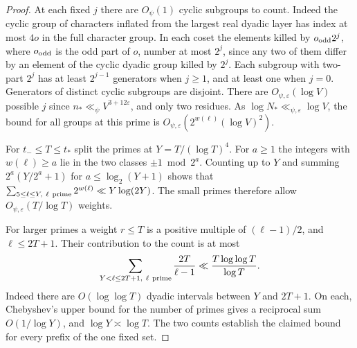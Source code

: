 \documentclass[a4paper,11pt]{article}
\theoremstyle{definition}
\theoremstyle{remark}
\numberwithin{equation}{section}
\begin{document}
\begin{proof}
At each fixed \(j\) there are \(O_\psi(1)\) cyclic subgroups to
count. Indeed the cyclic group of characters inflated from the
largest real dyadic layer has index at most \(4o\) in the full
character group. In each coset the elements killed by
\(o_{\rm odd}2^j\), where \(o_{\rm odd}\) is the odd part of
\(o\), number at most \(2^j\), since any two of them differ by
an element of the cyclic dyadic group killed by \(2^j\).
Each subgroup with two-part \(2^j\) has at least \(2^{j-1}\)
generators when \(j\ge1\), and at least one when \(j=0\).
Generators of distinct cyclic subgroups are disjoint.
There are \(O_{\psi,\varepsilon}(\log V)\) possible \(j\) since
\(n_*\ll_\psi V^{3+12\varepsilon}\), and only two residues.
As \(\log N_*\ll_{\psi,\varepsilon}\log V\), the bound for
all groups at this prime is \(O_{\psi,\varepsilon}
(2^{w(\ell)}(\log V)^2)\).

For \(t_-\le T\le t_*\) split the primes at
\(Y=T/(\log T)^4\). For \(a\ge1\) the integers with
\(w(\ell)\ge a\) lie in the two classes \(\pm1\bmod 2^a\).
Counting up to \(Y\) and summing \(2^a(Y/2^a+1)\) for
\(a\le\log_2(Y+1)\) shows that
\(\sum_{5\le\ell\le Y,\ \ell\ {\rm prime}}2^{w(\ell)}
\ll Y\log(2Y)\). The small primes therefore allow
\(O_{\psi,\varepsilon}(T/\log T)\) weights.

For larger primes a weight \(r\le T\) is a positive multiple of
\((\ell-1)/2\), and \(\ell\le2T+1\). Their contribution to
the count is at most
\[
       \sum_{Y<\ell\le2T+1,\ \ell\ {\rm prime}}
                       \frac{2T}{\ell-1}
                     \ll \frac{T\log\log T}{\log T}.
\]
Indeed there are \(O(\log\log T)\) dyadic intervals between
\(Y\) and \(2T+1\). On each, Chebyshev's upper bound for the
number of primes gives a reciprocal sum \(O(1/\log Y)\), and
\(\log Y\asymp\log T\). The two counts establish the claimed
bound for every prefix of the one fixed set.
\end{proof}
\end{document}
